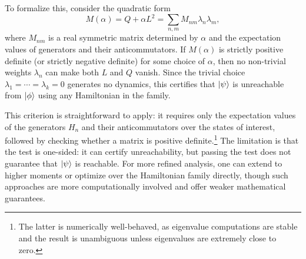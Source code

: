 \documentclass[aps,prx,reprint,superscriptaddress,footnote, twocolumn,notitlepage]{revtex4-2}
\begin{document}
To formalize this, consider the quadratic form
\begin{equation}
    M(\alpha) = Q + \alpha L^2 = \sum_{n,m} M_{nm} \lambda_n \lambda_m,
\end{equation}
where $M_{nm}$ is a real symmetric matrix determined by $\alpha$ and the expectation values of generators and their anticommutators. If $M(\alpha)$ is strictly positive definite (or strictly negative definite) for some choice of $\alpha$, then no non-trivial weights $\lambda_n$ can make both $L$ and $Q$ vanish. Since the trivial choice $\lambda_1 = \cdots = \lambda_k = 0$ generates no dynamics, this certifies that $\ket{\psi}$ is unreachable from $\ket{\phi}$ using any Hamiltonian in the family.

This criterion is straightforward to apply: it requires only the expectation values of the generators $H_n$ and their anticommutators over the states of interest, followed by checking whether a matrix is positive definite.\footnote{The latter is numerically well-behaved, as eigenvalue computations are stable and the result is unambiguous unless eigenvalues are extremely close to zero.} The limitation is that the test is one-sided: it can certify unreachability, but passing the test does not guarantee that $\ket{\psi}$ is reachable. For more refined analysis, one can extend to higher moments or optimize over the Hamiltonian family directly, though such approaches are more computationally involved and offer weaker mathematical guarantees.
\end{document}
